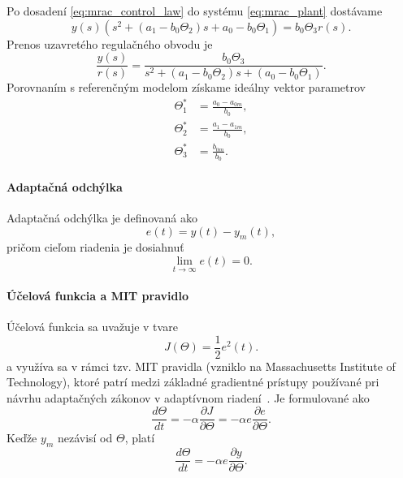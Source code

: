 Po dosadení \eqref{eq:mrac_control_law} do systému
\eqref{eq:mrac_plant} dostávame 
\begin{equation}
	y(s)\left(
	s^2 + (a_1 - b_0\Theta_2)s + a_0 - b_0\Theta_1
	\right)
	=
	b_0\Theta_3 r(s).
\end{equation}
Prenos uzavretého regulačného obvodu je
\begin{equation}
	\frac{y(s)}{r(s)} =
	\frac{b_0\Theta_3}
	{s^2 + (a_1 - b_0\Theta_2)s + (a_0 - b_0\Theta_1)}.
\end{equation}
Porovnaním s referenčným modelom získame ideálny vektor parametrov
\begin{align}
	\Theta_1^\ast &= \frac{a_0 - a_{0m}}{b_0}, 
	\label{eq:mracIdeal_parameters_theta_1} \\
	\Theta_2^\ast &= \frac{a_1 - a_{1m}}{b_0}, 
	\label{eq:mracIdeal_parameters_theta_2} \\
	\Theta_3^\ast &= \frac{b_{0m}}{b_0}.
	\label{eq:mracIdeal_parameters_theta_3}
\end{align}

\paragraph{Adaptačná odchýlka}

Adaptačná odchýlka je definovaná ako
\begin{equation}
	e(t) = y(t) - y_m(t),
\end{equation}
pričom cieľom riadenia je dosiahnuť
\begin{equation}
	\lim_{t \to \infty} e(t) = 0.
\end{equation}

\paragraph{Účelová funkcia a MIT pravidlo}

Účelová funkcia sa uvažuje v tvare
\begin{equation}
	J(\Theta) = \frac{1}{2} e^2(t).
\end{equation}
a využíva sa v rámci tzv. MIT pravidla (vzniklo na Massachusetts Institute of Technology), ktoré patrí medzi základné gradientné prístupy používané
pri návrhu adaptačných zákonov v adaptívnom riadení~\cite{tao2003}.
Je formulované ako
\begin{equation}
	\frac{d\Theta}{dt}
	=
	-\alpha \frac{\partial J}{\partial \Theta}
	=
	-\alpha e \frac{\partial e}{\partial \Theta}.
\end{equation}
Keďže $y_m$ nezávisí od $\Theta$, platí
\begin{equation}
	\frac{d\Theta}{dt}
	=
	-\alpha e \frac{\partial y}{\partial \Theta}.
\end{equation}

